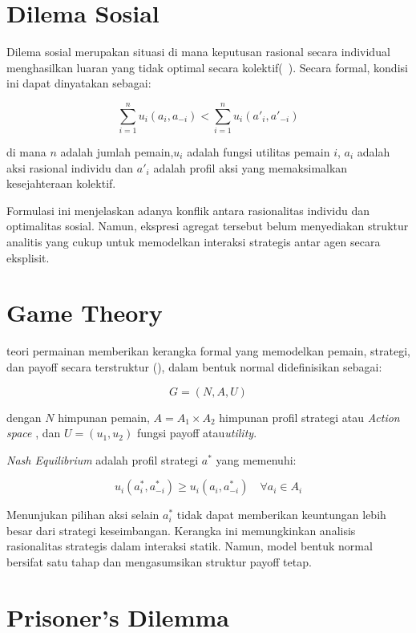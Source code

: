 \section{Dilema Sosial}

Dilema sosial merupakan situasi di mana keputusan rasional secara individual menghasilkan luaran yang tidak optimal secara kolektif(~\cite{axelrod_evolution_1981}). Secara formal, kondisi ini dapat dinyatakan sebagai:


\[\sum_{i=1}^{n} u_i(a_i, a_{-i}) 
<
\sum_{i=1}^{n} u_i(a'_i, a'_{-i})\]


di mana $n$ adalah jumlah pemain,$u_i$ adalah fungsi utilitas pemain $i$, $a_i$ adalah aksi rasional individu dan $a'_i$ adalah profil aksi yang memaksimalkan kesejahteraan kolektif.

Formulasi ini menjelaskan adanya konflik antara rasionalitas individu dan optimalitas sosial. Namun, ekspresi agregat tersebut belum menyediakan struktur analitis yang cukup untuk memodelkan interaksi strategis antar agen secara eksplisit.


\section{Game Theory}

teori permainan memberikan kerangka formal yang memodelkan pemain, strategi, dan payoff secara terstruktur (\cite{bonanno_game_2024}), dalam bentuk normal didefinisikan sebagai:

\[G = (N, A, U)\]

dengan $N$ himpunan pemain, $A = A_1 \times A_2$ himpunan profil strategi atau \textit{Action space }, dan $U = (u_1, u_2)$ fungsi payoff atau\textit{utility}.

\textit{Nash Equilibrium} adalah profil strategi $a^*$ yang memenuhi:

\[
u_i(a_i^*, a_{-i}^*) \ge u_i(a_i, a_{-i}^*)
\quad \forall a_i \in A_i
\]

Menunjukan pilihan aksi selain $a_i^*$ tidak dapat memberikan keuntungan lebih besar dari strategi keseimbangan. Kerangka ini memungkinkan analisis rasionalitas strategis dalam interaksi statik. Namun, model bentuk normal bersifat satu tahap dan mengasumsikan struktur payoff tetap. 

\section{Prisoner's Dilemma}\label{sec:PrisonersDilemma}

